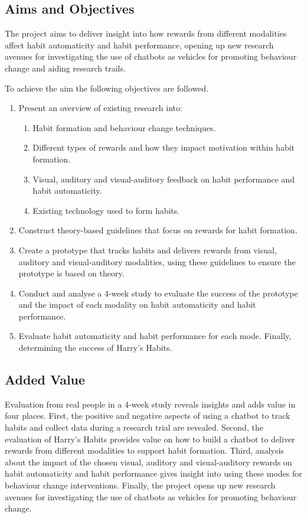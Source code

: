 \subsection{Aims and Objectives}
The project aims to deliver insight into how rewards from different modalities affect habit automaticity and habit performance, opening up new research avenues for investigating the use of chatbots as vehicles for promoting behaviour change and aiding research trails.

To achieve the aim the following objectives are followed.

\begin{enumerate}
    \item Present an overview of existing research into:
      \begin{enumerate}
        \item Habit formation and behaviour change techniques.
        \item Different types of rewards and how they impact motivation within habit formation.
        \item Visual, auditory and visual-auditory feedback on habit performance and habit automaticity.
        \item Existing technology used to form habits.
      \end{enumerate}
    \item Construct theory-based guidelines that focus on rewards for habit formation.
    \item Create a prototype that tracks habits and delivers rewards from visual, auditory and visual-auditory modalities, using these guidelines to ensure the prototype is based on theory.
    \item Conduct and analyse a 4-week study to evaluate the success of the prototype and the impact of each modality on habit automaticity and habit performance.
    \item Evaluate habit automaticity and habit performance for each mode. Finally, determining the success of Harry's Habits.
\end{enumerate}

\subsection{Added Value}
Evaluation from real people in a 4-week study reveals insights and adds value in four places. First, the positive and negative aspects of using a chatbot to track habits and collect data during a research trial are revealed. Second, the evaluation of Harry's Habits provides value on how to build a chatbot to deliver rewards from different modalities to support habit formation. Third, analysis about the impact of the chosen visual, auditory and visual-auditory rewards on habit automaticity and habit performance gives insight into using these modes for behaviour change interventions. Finally, the project opens up new research avenues for investigating the use of chatbots as vehicles for promoting behaviour change.
\newpage
